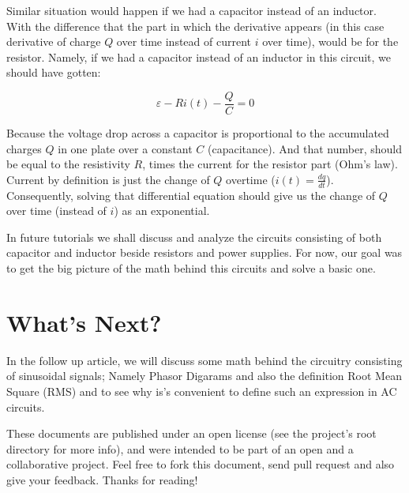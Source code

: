 \documentclass{article}
\begin{document}
	Similar situation would happen if we had a capacitor instead of an inductor. With the difference that the part in which the derivative appears (in this case derivative of charge $Q$ over time instead of current $i$ over time), would be for the resistor. Namely, if we had a capacitor instead of an inductor in this circuit, we should have gotten:
	
	$$\varepsilon - Ri(t) - \frac{Q}{C} = 0 $$
	
	Because the voltage drop across a capacitor is proportional to the accumulated charges $Q$ in one plate over a constant $C$ (capacitance). And that number, should be equal to the resistivity  $R$, times the current for the resistor part (Ohm's law). Current by definition is just the change of $Q$ overtime ($i(t) = \frac{dq}{dt}$). Consequently, solving that differential equation should give us the change of $Q$ over time (instead of $i$) as an exponential.
	
	In future tutorials we shall discuss and analyze the circuits consisting of both capacitor and inductor beside resistors and power supplies. For now, our goal was to get the big picture of the math behind this circuits and solve a basic one.
	
	\section{What's Next?}
	In the follow up article, we will discuss some math behind the circuitry consisting of sinusoidal signals; Namely Phasor Digarams and also the definition Root Mean Square (RMS) and to see why is's convenient to define such an expression in AC circuits.
	
	These documents are published under an open license (see the project's root directory for more info), and were intended to be part of an open and a collaborative project. Feel free to fork this document, send pull request and also give your feedback. Thanks for reading!
	
\end{document}

